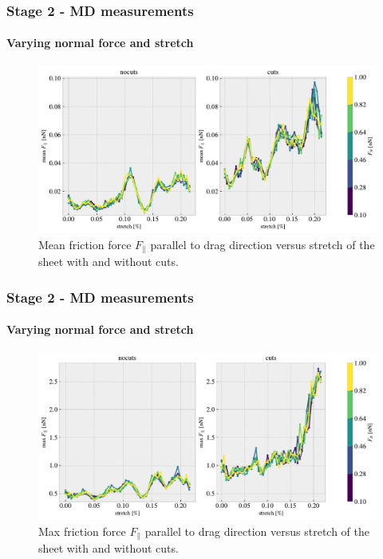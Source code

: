 \documentclass[
	10pt, %
]{beamer}
\begin{document}
\begin{frame}
	\frametitle{Stage 2 - MD measurements}
	\framesubtitle{Varying normal force and stretch}
	\begin{figure}
		\includegraphics[width=\linewidth]{figures/multi_lowFN2.pdf}
		\caption{Mean friction force $F_{\parallel}$ parallel to drag direction versus stretch of the sheet with and without cuts.}
	\end{figure}	
\end{frame}


\begin{frame}
	\frametitle{Stage 2 - MD measurements}
	\framesubtitle{Varying normal force and stretch}
	\begin{figure}
		\includegraphics[width=\linewidth]{figures/multi_lowFN1.pdf}
		\caption{Max friction force $F_{\parallel}$ parallel to drag direction versus stretch of the sheet with and without cuts.}
	\end{figure}	
\end{frame}
\end{document}
